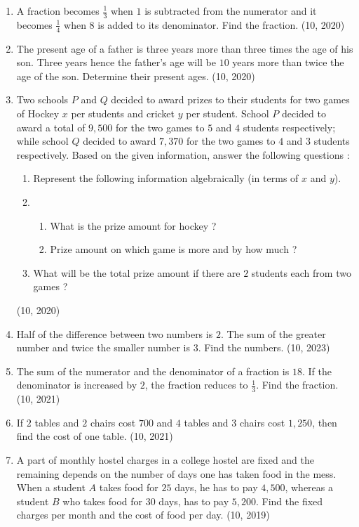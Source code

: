 \begin{enumerate}[label=\thesubsection.\arabic*, ref=\thesubsection.\theenumi]
\item A fraction becomes $\frac{1}{3}$ when $1$ is subtracted from the numerator and it becomes $\frac{1}{4}$ when $8$ is added to its denominator. Find the fraction.
\hfill (10, 2020)
\item The present age of a father is three years more than three times the age of his son. Three years hence the father's age will be $10$ years more than twice the age of the son. Determine their present ages.
\hfill (10, 2020)
\item Two schools $P$ and $Q$ decided to award prizes to their students for two games of Hockey \rupee $x$ per students and cricket \rupee $y$ per student. School $P$
decided to award a total of \rupee $9,500$ for the two games to $5$ and $4$ students respectively; while school $Q$ decided to award \rupee $7,370$ for the two games to $4$ and $3$ students respectively.
Based on the given information, answer the following questions :
\begin{enumerate}
    \item Represent the following information algebraically (in terms of $x$ and $y$).
    \item\begin{enumerate}
\item What is the prize amount for hockey ?
\item Prize amount on which game is more and by how much ?
    \end{enumerate}
    \item What will be the total prize amount if there are $2$ students each from two games ?
\end{enumerate}
\hfill (10, 2020)
\item Half of the difference between two numbers is $2$. The sum of the greater number and twice the smaller number is $3$. Find the numbers.
\hfill (10, 2023)
    \item The sum of the numerator and the denominator of a fraction is $18$. If the denominator is increased by $2$, the fraction reduces to $\frac{1}{3}$. Find the fraction.
\hfill (10, 2021)
    \item If $2$ tables and $2$ chairs cost \rupee $700$ and $4$ tables and $3$ chairs cost \rupee $1,250$, then find the cost of one table.
\hfill (10, 2021)
\item A part of monthly hostel charges in a college hostel are fixed and the remaining depends on the number of days one has taken food in the mess. When a student $A$ takes food for $25$ days, he has to pay {\rupee $4,500$}, whereas a student $B$ who takes food for $30$ days, has to pay {\rupee $5,200$}. Find the fixed charges per month and the cost of food per day.
\hfill (10, 2019)



\end{enumerate}
